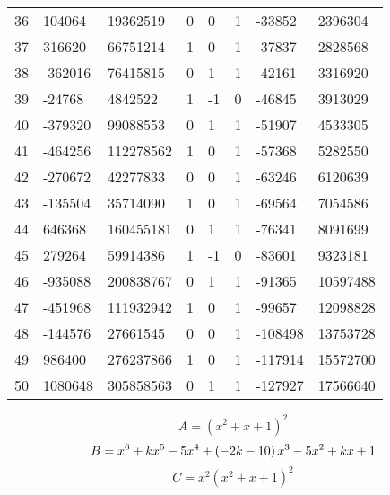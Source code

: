 \documentclass{amsart}
\begin{document}
\begin{longtable}{|l|l|l|lllll|}
36&104064&19362519&0&0&1&-33852&2396304\\
37&316620&66751214&1&0&1&-37837&2828568\\
38&-362016&76415815&0&1&1&-42161&3316920\\
39&-24768&4842522&1&-1&0&-46845&3913029\\
40&-379320&99088553&0&1&1&-51907&4533305\\
41&-464256&112278562&1&0&1&-57368&5282550\\
42&-270672&42277833&0&0&1&-63246&6120639\\
43&-135504&35714090&1&0&1&-69564&7054586\\
44&646368&160455181&0&1&1&-76341&8091699\\
45&279264&59914386&1&-1&0&-83601&9323181\\
46&-935088&200838767&0&1&1&-91365&10597488\\
47&-451968&111932942&1&0&1&-99657&12098828\\
48&-144576&27661545&0&0&1&-108498&13753728\\
49&986400&276237866&1&0&1&-117914&15572700\\
50&1080648&305858563&0&1&1&-127927&17566640\\
\hline
\end{longtable}
$$A=(x^2
 + x
 + 1)^{2}$$
$$B=x^6
 + k\*x^5
 - 5\*x^4
 + \left(-2\*k
 - 10\right) \*x^3
 - 5\*x^2
 + k\*x
 + 1$$
$$C=x^2(x^2
 + x
 + 1)^{2}$$
\end{document}
